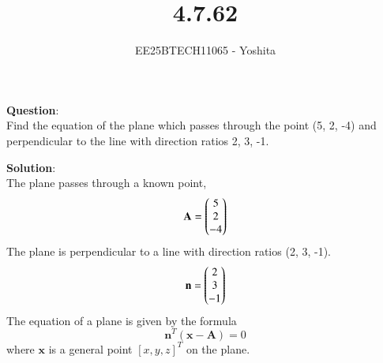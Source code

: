 \documentclass[journal]{IEEEtran}
\begin{document}

\vspace{3cm}

\title{4.7.62}
\author{EE25BTECH11065 - Yoshita}
{\let\newpage\relax\maketitle}

\renewcommand{\thefigure}{\theenumi}
\renewcommand{\thetable}{\theenumi}
\setlength{\intextsep}{10pt} %

\textbf{Question}:\\
Find the equation of the plane which passes through the point (5, 2, -4) and perpendicular to the line with direction ratios 2, 3, -1.\\
\bigskip

\textbf{Solution}:\\
The plane passes through a known point,
\[ \mathbf{A} = \begin{pmatrix}5\\2\\-4\end{pmatrix} \]
The plane is perpendicular to a line with direction ratios (2, 3, -1). 
\[ \mathbf{n} = \begin{pmatrix}2\\3\\-1\end{pmatrix} \]
The equation of a plane is given by the formula\[ \mathbf{n}^T (\mathbf{x} - \mathbf{A}) = 0\] where $\mathbf{x}$ is a general point $[x, y, z]^T$ on the plane.
\end{document}
